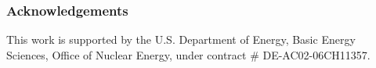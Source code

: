 
\begin{frame}[ctb!]
  \frametitle{Acknowledgements}  
  This work is supported by the U.S. Department of Energy, Basic Energy 
  Sciences, Office of Nuclear Energy, under contract \# DE-AC02-06CH11357.
\end{frame}
